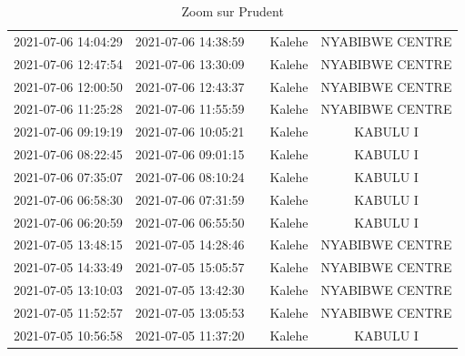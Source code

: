 \documentclass[
]{book}
\begin{document}
\begin{table}

\caption{\label{tab:unnamed-chunk-13}Zoom sur Prudent}
\centering
\begin{tabular}[t]{c|c|>{}c|c|c}
\hline
\cellcolor{red}{start} & \cellcolor{red}{end} & \cellcolor{red}{temps} & \cellcolor{red}{Territoire} & \cellcolor{red}{Village}\\
\hline
2021-07-06 14:04:29 & 2021-07-06 14:38:59 & \cellcolor[HTML]{440154}{\textcolor{white}{34}} & Kalehe & NYABIBWE CENTRE\\
\hline
2021-07-06 12:47:54 & 2021-07-06 13:30:09 & \cellcolor[HTML]{1E9D89}{\textcolor{white}{42}} & Kalehe & NYABIBWE CENTRE\\
\hline
2021-07-06 12:00:50 & 2021-07-06 12:43:37 & \cellcolor[HTML]{306B8E}{\textcolor{white}{43}} & Kalehe & NYABIBWE CENTRE\\
\hline
2021-07-06 11:25:28 & 2021-07-06 11:55:59 & \cellcolor[HTML]{355E8D}{\textcolor{white}{31}} & Kalehe & NYABIBWE CENTRE\\
\hline
2021-07-06 09:19:19 & 2021-07-06 10:05:21 & \cellcolor[HTML]{277E8E}{\textcolor{white}{46}} & Kalehe & KABULU I\\
\hline
2021-07-06 08:22:45 & 2021-07-06 09:01:15 & \cellcolor[HTML]{297A8E}{\textcolor{white}{39}} & Kalehe & KABULU I\\
\hline
2021-07-06 07:35:07 & 2021-07-06 08:10:24 & \cellcolor[HTML]{3E4C8A}{\textcolor{white}{35}} & Kalehe & KABULU I\\
\hline
2021-07-06 06:58:30 & 2021-07-06 07:31:59 & \cellcolor[HTML]{375A8C}{\textcolor{white}{33}} & Kalehe & KABULU I\\
\hline
2021-07-06 06:20:59 & 2021-07-06 06:55:50 & \cellcolor[HTML]{306B8E}{\textcolor{white}{35}} & Kalehe & KABULU I\\
\hline
2021-07-05 13:48:15 & 2021-07-05 14:28:46 & \cellcolor[HTML]{2E6E8E}{\textcolor{white}{41}} & Kalehe & NYABIBWE CENTRE\\
\hline
2021-07-05 14:33:49 & 2021-07-05 15:05:57 & \cellcolor[HTML]{3A558C}{\textcolor{white}{32}} & Kalehe & NYABIBWE CENTRE\\
\hline
2021-07-05 13:10:03 & 2021-07-05 13:42:30 & \cellcolor[HTML]{433E85}{\textcolor{white}{32}} & Kalehe & NYABIBWE CENTRE\\
\hline
2021-07-05 11:52:57 & 2021-07-05 13:05:53 & \cellcolor[HTML]{414287}{\textcolor{white}{73}} & Kalehe & NYABIBWE CENTRE\\
\hline
2021-07-05 10:56:58 & 2021-07-05 11:37:20 & \cellcolor[HTML]{20928C}{\textcolor{white}{40}} & Kalehe & KABULU I\\

\end{tabular}
\end{table}
\end{document}
